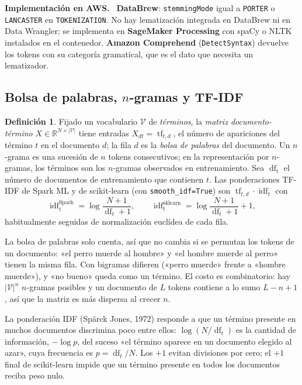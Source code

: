 \documentclass[11pt,a4paper]{article}
\theoremstyle{plain}
\theoremstyle{definition}
\newtheorem{definicion}[teorema]{Definición}
\theoremstyle{remark}
\newcommand{\R}{\mathbb{R}}
\newcommand{\idf}{\operatorname{idf}}
\newcommand{\tf}{\operatorname{tf}}
\newcommand{\df}{\operatorname{df}}
\newcommand{\1}{\mathbf{1}}
\newenvironment{aws}{\par\medskip\sloppy\noindent\textbf{Implementación en AWS.}\ }{\par\medskip}
\begin{document}
\begin{aws}
\textbf{DataBrew}: \texttt{stemmingMode} igual a \texttt{PORTER} o
\texttt{LANCASTER} en \texttt{TOKENIZATION}. No hay lematización integrada
en DataBrew ni en Data Wrangler; se implementa en \textbf{SageMaker
Processing} con spaCy o NLTK instalados en el contenedor. \textbf{Amazon
Comprehend} (\texttt{DetectSyntax}) devuelve los tokens con su categoría
gramatical, que es el dato que necesita un lematizador.
\end{aws}

\subsection{Bolsa de palabras, $n$-gramas y TF-IDF}\label{sec:tfidf}

\begin{definicion}
Fijado un vocabulario $\mathcal V$ de \emph{términos}, la \emph{matriz
documento-término} $X\in\R^{N\times|\mathcal V|}$ tiene entradas
$X_{dt}=\tf_{t,d}$, el número de apariciones del término $t$ en el
documento $d$; la fila $d$ es la \emph{bolsa de palabras} del documento.
Un $n$-grama es una sucesión de $n$ tokens consecutivos; en la
representación por $n$-gramas, los términos son los $n$-gramas observados
en entrenamiento. Sea $\df_t$ el número de documentos de entrenamiento que
contienen $t$. Las ponderaciones TF-IDF de Spark ML y de scikit-learn
(con \texttt{smooth\_idf=True}) son $\tf_{t,d}\cdot\idf_t$ con
\[
\idf_t^{\text{Spark}}=\log\frac{N+1}{\df_t+1},\qquad
\idf_t^{\text{sklearn}}=\log\frac{N+1}{\df_t+1}+1,
\]
habitualmente seguidas de normalización euclídea de cada fila.
\end{definicion}

La bolsa de palabras solo cuenta, así que no cambia si se permutan los
tokens de un documento: «el perro muerde al hombre» y «el hombre muerde al
perro» tienen la misma fila. Con bigramas difieren («perro muerde» frente
a «hombre muerde»), y «no bueno» queda como un término. El costo es
combinatorio: hay $|\mathcal V|^n$ $n$-gramas posibles y un documento de
$L$ tokens contiene a lo sumo $L-n+1$, así que la matriz es más dispersa
al crecer $n$.

La ponderación IDF (Spärck Jones, 1972) responde a que un término presente
en muchos documentos discrimina poco entre ellos: $\log(N/\df_t)$ es la
cantidad de información, $-\log p$, del suceso «el término aparece en un
documento elegido al azar», cuya frecuencia es $p=\df_t/N$. Los $+1$
evitan divisiones por cero; el $+1$ final de scikit-learn impide que un
término presente en todos los documentos reciba peso nulo.
\end{document}
